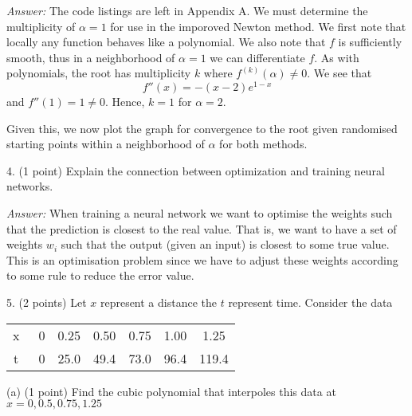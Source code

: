 \documentclass{article}
\newenvironment{answer}{\textit{Answer:}}{}
\begin{document}
\begin{answer}
    The code listings are left in Appendix A. We must determine the multiplicity
    of $\alpha = 1$ for use in the imporoved Newton method. We first note that
    locally any function behaves like a polynomial. We also note that $f$ is
    sufficiently smooth, thus in a neighborhood of
    $\alpha = 1$ we can differentiate $f$. As with polynomials, the root has
    multiplicity $k$ where $f^{(k)}(\alpha) \neq 0$. We see that
    \begin{equation*}
        f''(x) = -(x-2)e^{1-x}
    \end{equation*}
    and $f''(1) = 1 \neq 0$. Hence, $k = 1$ for $\alpha = 2$.

    Given this, we now plot the graph for convergence to the root given
    randomised starting points within a neighborhood of $\alpha$
    for both methods.
\end{answer}

4. (1 point) Explain the connection between optimization and training neural
networks.

\begin{answer}
    When training a neural network we want to optimise the weights such that the
    prediction is closest to the real value. That is, we want to have a set of weights
    $w_i$ such that the output (given an input) is closest to some true value.
    This is an optimisation problem since we have to adjust these weights
    according to some rule to reduce the error value.
\end{answer}

5. (2 points) Let $x$ represent a distance the $t$ represent time. Consider the
data
\begin{center}
    \begin{tabular}{c c c c c c c}
        x & \vline  \ 0 & 0.25 & 0.50 & 0.75 & 1.00 & 1.25  \\
        t & \vline \ 0  & 25.0 & 49.4 & 73.0 & 96.4 & 119.4
    \end{tabular}
\end{center}
(a) (1 point) Find the cubic polynomial that interpoles this data at
$x = 0, 0.5, 0.75, 1.25$
\end{document}
